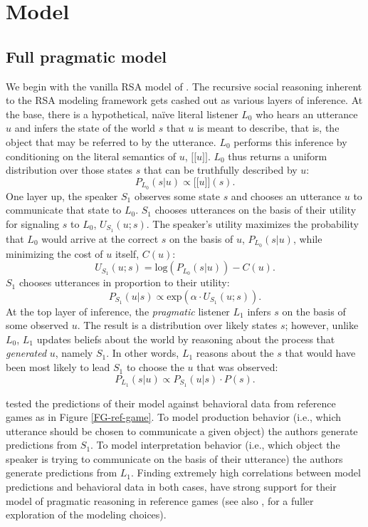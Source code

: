 \documentclass[10pt,a4paper]{article}
\newcommand{\sem}[1]{\mbox{$[\![$#1$]\!]$}}
\begin{document}
\section{Model}
\subsection{Full pragmatic model}

We begin with the vanilla RSA model of . The recursive social reasoning inherent to the RSA modeling framework gets cashed out as various layers of inference. At the base, there is a hypothetical, na\"ive literal listener $L_0$ who hears an utterance $u$ and infers the state of the world $s$ that $u$ is meant to describe, that is, the object that may be referred to by the utterance. $L_0$ performs this inference by conditioning on the literal semantics of $u$, \sem{$u$}. $L_0$ thus returns a uniform distribution over those states $s$ that can be truthfully described by $u$:
$$P_{L_{0}}(s|u) \propto \sem{$u$}(s).$$
One layer up, the speaker $S_1$ observes some state $s$ and chooses an utterance $u$ to communicate that state to $L_0$. $S_1$ chooses utterances on the basis of their utility for signaling $s$ to $L_0$, $U_{S_1}(u;s)$. The speaker's utility maximizes the probability that $L_0$ would arrive at the correct $s$ on the basis of $u$, $P_{L_{0}}(s|u)$, while minimizing the cost of $u$ itself, $C(u)$:
$$U_{S_{1}}(u;s) = \textrm{log}(P_{L_{0}}(s|u)) - C(u).$$
$S_1$ chooses utterances in proportion to their utility:
$$P_{S_{1}} (u|s) \propto   \textrm{exp}(\alpha \cdot U_{S_{1}} (u;s)).$$
At the top layer of inference, the \emph{pragmatic} listener $L_1$ infers $s$ on the basis of some observed $u$. The result is a distribution over likely states $s$; however, unlike $L_0$, $L_1$ updates beliefs about the world by reasoning about the process that \emph{generated} $u$, namely $S_1$. In other words, $L_1$ reasons about the $s$ that would have been most likely to lead $S_1$ to choose the $u$ that was observed:
$$P_{L_{1}}(s|u) \propto P_{S_{1}}(u|s) \cdot P(s).$$

 tested the predictions of their model against behavioral data from reference games as in Figure \ref{FG-ref-game}. To model production behavior (i.e., which utterance should be chosen to communicate a given object) the authors generate predictions from $S_1$. To model interpretation behavior (i.e., which object the speaker is trying to communicate on the basis of their utterance) the authors generate predictions from $L_1$. Finding extremely high correlations between model predictions and behavioral data in both cases, \citeauthor{frankgoodman2012} have strong support for their model of pragmatic reasoning in reference games (see also , for a fuller exploration of the modeling choices).
\end{document}
